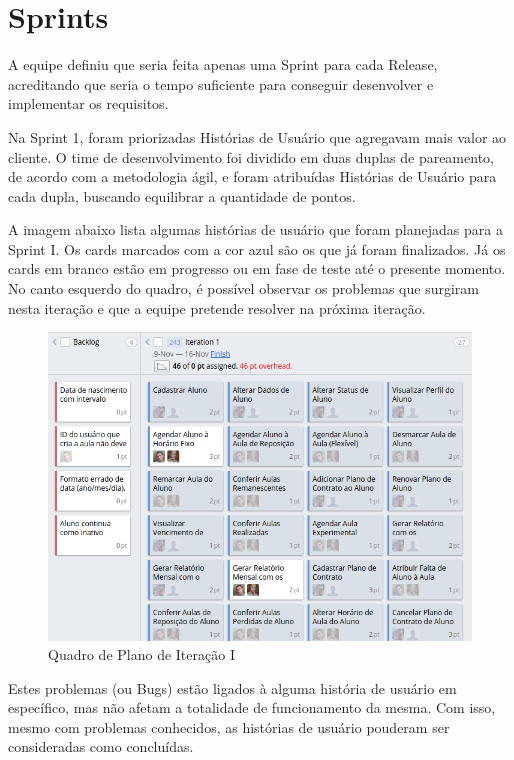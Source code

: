 \section[Sprints]{Sprints}
A equipe definiu que seria feita apenas uma Sprint para cada Release, acreditando que seria o tempo suficiente para conseguir desenvolver e implementar os requisitos.

Na Sprint 1, foram priorizadas Histórias de Usuário que agregavam mais valor ao cliente. O time de desenvolvimento foi dividido em duas duplas de pareamento, de acordo com a metodologia ágil, e foram atribuídas Histórias de Usuário para cada dupla, buscando equilibrar a quantidade de pontos.

A imagem abaixo lista algumas histórias de usuário que foram planejadas para a Sprint I. Os cards marcados com a cor azul são os que já foram finalizados. Já os cards em branco estão em progresso ou em fase de teste até o presente momento. No canto esquerdo do quadro, é possível observar os problemas que surgiram nesta iteração e que a equipe pretende resolver na próxima iteração. 

\begin{figure}[!htb]
    \centering
    \includegraphics[width=\textwidth]{figuras/plano_iteracao_1.png}
    \caption{Quadro de Plano de Iteração I}
    \label{fig:plano_iteracao_1}
\end{figure}

Estes problemas (ou Bugs) estão ligados à alguma história de usuário em específico, mas não afetam a totalidade de funcionamento da mesma. Com isso, mesmo com problemas conhecidos, as histórias de usuário pouderam ser consideradas como concluídas.






